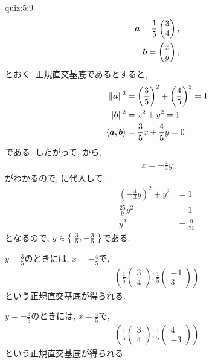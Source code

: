 \begin{answerof}{quiz:5:9}
  \begin{align*}
    \boldsymbol{a}=\frac{1}{5}\begin{pmatrix}3\\4\end{pmatrix},\\
    \boldsymbol{b}=\begin{pmatrix}x\\y\end{pmatrix},
  \end{align*}
  とおく.
  正規直交基底であるとすると,
  \begin{align}
    \|\boldsymbol{a}\|^2&=\left(\frac{3}{5}\right)^2+\left(\frac{4}{5}\right)^2=1\\
    \|\boldsymbol{b}\|^2&=x^2+y^2=1     \label{orthonorm:eq1}\\
    \Braket{\boldsymbol{a},\boldsymbol{b}}&=\frac{3}{5}x+\frac{4}{5}y=0
    \label{orthonorm:eq2}
  \end{align}
  である. したがって, から,
  \begin{align*}
    x=-\frac{4}{3}y
  \end{align*}
  がわかるので, に代入して,
  \begin{align*}
    \left(-\frac{4}{3}y\right)^2+y^2&=1\\
    \frac{25}{9}y^2&=1\\
    y^2&=\frac{9}{25}
  \end{align*}
  となるので, $y\in\Set{\frac{3}{5},-\frac{3}{5}}$である.

  $y=\frac{3}{5}$のときには,
  $x=-\frac{4}{5}$で,
  \begin{align*}
    (\frac{1}{5}\begin{pmatrix}3\\4\end{pmatrix},
    \frac{1}{5}\begin{pmatrix}-4\\3\end{pmatrix})
  \end{align*}
  という正規直交基底が得られる.

  $y=-\frac{3}{5}$のときには,
  $x=\frac{4}{5}$で,
  \begin{align*}
    (\frac{1}{5}\begin{pmatrix}3\\4\end{pmatrix},
    \frac{1}{5}\begin{pmatrix}4\\-3\end{pmatrix})
  \end{align*}
  という正規直交基底が得られる.
\end{answerof}
